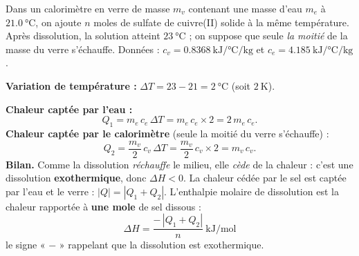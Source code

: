 \documentclass[11pt,a4paper]{article}
\newcommand{\dH}{\Delta H}
\begin{document}
\begin{exemple}
Dans un calorimètre en verre de masse $m_v$ contenant une masse d'eau $m_e$ à $\SI{21.0}{\celsius}$, on
ajoute $n$ moles de sulfate de cuivre(II) solide à la même température. Après dissolution, la solution
atteint $\SI{23}{\celsius}$ ; on suppose que seule \emph{la moitié} de la masse du verre s'échauffe.
Données : $c_v = \SI{0.8368}{\kilo\joule\per\celsius\per\kilogram}$ et
$c_e = \SI{4.185}{\kilo\joule\per\celsius\per\kilogram}$.

\textbf{Variation de température :} $\Delta T = 23 - 21 = \SI{2}{\celsius}$ (soit $\SI{2}{\kelvin}$).

\textbf{Chaleur captée par l'eau :}
\[ Q_1 = m_e \, c_e \, \Delta T = m_e \, c_e \times 2 = 2\,m_e\,c_e. \]
\textbf{Chaleur captée par le calorimètre} (seule la moitié du verre s'échauffe) :
\[ Q_2 = \frac{m_v}{2}\, c_v \, \Delta T = \frac{m_v}{2}\, c_v \times 2 = m_v\,c_v. \]
\textbf{Bilan.} Comme la dissolution \emph{réchauffe} le milieu, elle \emph{cède} de la chaleur : c'est
une dissolution \textbf{exothermique}, donc $\dH < 0$. La chaleur cédée par le sel est captée par l'eau
et le verre : $|Q| = |Q_1 + Q_2|$. L'enthalpie molaire de dissolution est la chaleur rapportée à
\textbf{une mole} de sel dissous :
\[ \boxed{\;\dH = \frac{-\,|Q_1 + Q_2|}{n}\ \si{\kilo\joule\per\mol}\;} \]
le signe « $-$ » rappelant que la dissolution est exothermique.
\end{exemple}
\end{document}
